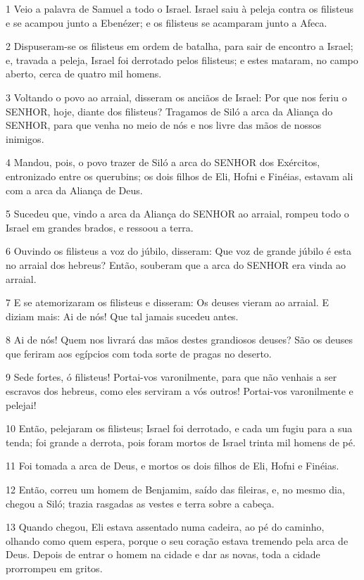 \par 1 Veio a palavra de Samuel a todo o Israel. Israel saiu à peleja contra os filisteus e se acampou junto a Ebenézer; e os filisteus se acamparam junto a Afeca.
\par 2 Dispuseram-se os filisteus em ordem de batalha, para sair de encontro a Israel; e, travada a peleja, Israel foi derrotado pelos filisteus; e estes mataram, no campo aberto, cerca de quatro mil homens.
\par 3 Voltando o povo ao arraial, disseram os anciãos de Israel: Por que nos feriu o SENHOR, hoje, diante dos filisteus? Tragamos de Siló a arca da Aliança do SENHOR, para que venha no meio de nós e nos livre das mãos de nossos inimigos.
\par 4 Mandou, pois, o povo trazer de Siló a arca do SENHOR dos Exércitos, entronizado entre os querubins; os dois filhos de Eli, Hofni e Finéias, estavam ali com a arca da Aliança de Deus.
\par 5 Sucedeu que, vindo a arca da Aliança do SENHOR ao arraial, rompeu todo o Israel em grandes brados, e ressoou a terra.
\par 6 Ouvindo os filisteus a voz do júbilo, disseram: Que voz de grande júbilo é esta no arraial dos hebreus? Então, souberam que a arca do SENHOR era vinda ao arraial.
\par 7 E se atemorizaram os filisteus e disseram: Os deuses vieram ao arraial. E diziam mais: Ai de nós! Que tal jamais sucedeu antes.
\par 8 Ai de nós! Quem nos livrará das mãos destes grandiosos deuses? São os deuses que feriram aos egípcios com toda sorte de pragas no deserto.
\par 9 Sede fortes, ó filisteus! Portai-vos varonilmente, para que não venhais a ser escravos dos hebreus, como eles serviram a vós outros! Portai-vos varonilmente e pelejai!
\par 10 Então, pelejaram os filisteus; Israel foi derrotado, e cada um fugiu para a sua tenda; foi grande a derrota, pois foram mortos de Israel trinta mil homens de pé.
\par 11 Foi tomada a arca de Deus, e mortos os dois filhos de Eli, Hofni e Finéias.
\par 12 Então, correu um homem de Benjamim, saído das fileiras, e, no mesmo dia, chegou a Siló; trazia rasgadas as vestes e terra sobre a cabeça.
\par 13 Quando chegou, Eli estava assentado numa cadeira, ao pé do caminho, olhando como quem espera, porque o seu coração estava tremendo pela arca de Deus. Depois de entrar o homem na cidade e dar as novas, toda a cidade prorrompeu em gritos.
